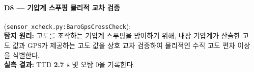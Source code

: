 \paragraph{\textbf{D8 --- 기압계 스푸핑 물리적 교차 검증}} (\texttt{sensor\_xcheck.py:BaroGpsCrossCheck}):  ~\\
\textbf{탐지 원리:} 고도를 조작하는 기압계 스푸핑을 방어하기 위해, 내장 기압계가 산출한 고도 값과 GPS가 제공하는 고도 값을 상호 교차 검증하여 물리적인 수직 고도 편차 이상을 식별한다.\\
\textbf{실측 결과:} TTD \textbf{2.7 s} 및 오탐 0을 기록한다. 


